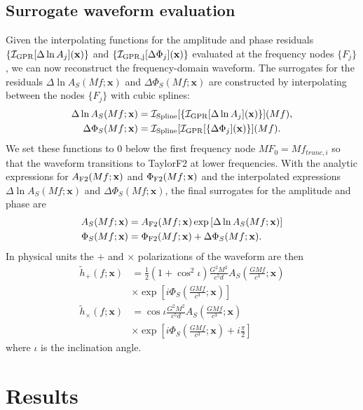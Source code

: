\documentclass[prd,aps,letter,twocolumn,floatfix,notitlepage,nofootinbib]{revtex4-1}
\def\bx{\mathbf{x}}
\begin{document}
\subsection{Surrogate waveform evaluation}

Given the interpolating functions for the amplitude and phase residuals $\{\mathcal{I}_{\rm GPR}[\Delta\ln A_j](\bx)\}$ and $\{\mathcal{I}_{\rm GPR, j}[\Delta\Phi_j](\bx)\}$ evaluated at the frequency nodes $\{F_j\}$, we can now reconstruct the frequency-domain waveform. The surrogates for the residuals $\Delta\ln A_S(Mf;\bx)$ and $\Delta\Phi_S(Mf;\bx)$ are constructed by interpolating between the nodes $\{F_j\}$ with cubic splines:
\begin{align}
\Delta\ln A_S(Mf;\bx) &= \mathcal{I}_{\rm Spline}[\{\mathcal{I}_{\rm GPR}[\Delta\ln A_j](\bx)\}](Mf),\\
\Delta\Phi_S(Mf;\bx) &= \mathcal{I}_{\rm Spline}[\mathcal{I}_{\rm GPR}[\{\Delta\Phi_j](\bx)\}](Mf).
\end{align}
We set these functions to 0 below the first frequency node $MF_0 =  Mf_{trunc,i}$ so that the waveform transitions to TaylorF2 at lower frequencies. With the analytic expressions for $A_{\rm F2}(Mf;\bx)$ and $\Phi_{\rm F2}(Mf;\bx)$ and the interpolated expressions $\Delta\ln A_S(Mf;\bx)$ and $\Delta\Phi_S(Mf;\bx)$, the final surrogates for the amplitude and phase are
\begin{align}
A_S(Mf;\bx) &= A_{\rm F2}(Mf;\bx) \exp\left[ \Delta\ln A_S(Mf;\bx) \right] \\
\Phi_S(Mf;\bx) &= \Phi_{\rm F2}(Mf;\bx) + \Delta\Phi_S(Mf;\bx).
\end{align}
In physical units the $+$ and $\times$ polarizations of the waveform are then 
\begin{align}
\tilde h_+(f; \bx) &= \frac{1}{2}(1+\cos^2\iota) \frac{G^2 M^2}{c^5 d} A_S\left(\frac{GMf}{c^3}; \bx\right) \nonumber \\
& \times \exp\left[i \Phi_S\left(\frac{GMf}{c^3}; \bx\right)\right] \\
\tilde h_\times(f; \bx) &= \cos\iota \frac{G^2 M^2}{c^5 d} A_S\left(\frac{GMf}{c^3}; \bx\right) \nonumber \\
& \times \exp\left[i \Phi_S\left(\frac{GMf}{c^3}; \bx\right) + i \frac{\pi}{2}\right]
\end{align}
where $\iota$ is the inclination angle.



\section{Results}
\end{document}
